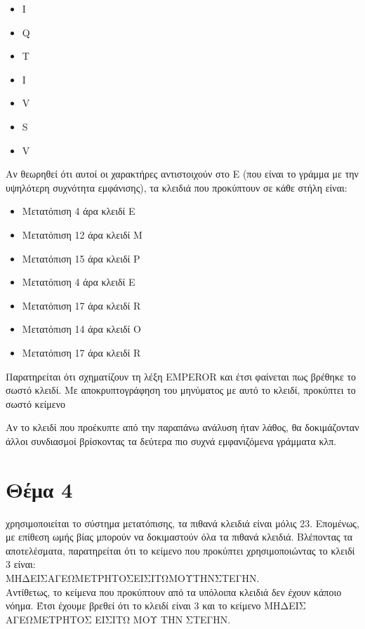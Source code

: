 \documentclass[a4paper, 11pt]{article}
\newcommand{\lt}{\latintext}
\newcommand\tab[1][1cm]{\hspace*{#1}}
\begin{document}
{\lt
\begin{itemize}
	\item I
	\item Q
	\item T
	\item I
	\item V
	\item S
	\item V
\end{itemize}
}

Αν θεωρηθεί ότι αυτοί οι χαρακτήρες αντιστοιχούν στο {\lt E} (που είναι το γράμμα με την υψηλότερη συχνότητα εμφάνισης), τα
κλειδιά που προκύπτουν σε κάθε στήλη είναι:

\begin{itemize}
	\item Μετατόπιση 4 άρα κλειδί {\lt E}
	\item Μετατόπιση 12 άρα κλειδί {\lt M}
	\item Μετατόπιση 15 άρα κλειδί {\lt P}
	\item Μετατόπιση 4 άρα κλειδί {\lt E}
	\item Μετατόπιση 17 άρα κλειδί {\lt R}
	\item Μετατόπιση 14 άρα κλειδί {\lt O}
	\item Μετατόπιση 17 άρα κλειδί {\lt R}
\end{itemize}

Παρατηρείται ότι σχηματίζουν τη λέξη {\lt EMPEROR} και έτσι φαίνεται πως βρέθηκε το σωστό κλειδί. Με αποκρυπτογράφηση του
μηνύματος με αυτό το κλειδί, προκύπτει το σωστό κείμενο

Αν το κλειδί που προέκυπτε από την παραπάνω ανάλυση ήταν λάθος, θα δοκιμάζονταν άλλοι συνδιασμοί βρίσκοντας τα δεύτερα πιο συχνά εμφανιζόμενα γράμματα κλπ.




\newpage


\section*{Θέμα 4}
 χρησιμοποιείται το σύστημα μετατόπισης, τα πιθανά κλειδιά είναι μόλις 23. Επομένως, με επίθεση ωμής βίας μπορούν να
δοκιμαστούν όλα τα πιθανά κλειδιά. Βλέποντας τα αποτελέσματα, παρατηρείται ότι το κείμενο που προκύπτει χρησιμοποιώντας το κλειδί 3 είναι:\\
ΜΗΔΕΙΣΑΓΕΩΜΕΤΡΗΤΟΣΕΙΣΙΤΩΜΟΥΤΗΝΣΤΕΓΗΝ.\\
Αντίθετως, το κείμενα που προκύπτουν από τα υπόλοιπα κλειδιά δεν έχουν κάποιο νόημα. Έτσι έχουμε βρεθεί ότι
το κλειδί είναι 3 και το κείμενο ΜΗΔΕΙΣ ΑΓΕΩΜΕΤΡΗΤΟΣ ΕΙΣΙΤΩ ΜΟΥ ΤΗΝ ΣΤΕΓΗΝ.
\end{document}
